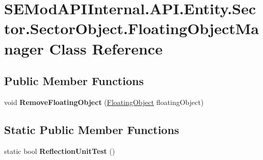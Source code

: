 \hypertarget{class_s_e_mod_a_p_i_internal_1_1_a_p_i_1_1_entity_1_1_sector_1_1_sector_object_1_1_floating_object_manager}{}\section{S\+E\+Mod\+A\+P\+I\+Internal.\+A\+P\+I.\+Entity.\+Sector.\+Sector\+Object.\+Floating\+Object\+Manager Class Reference}
\label{class_s_e_mod_a_p_i_internal_1_1_a_p_i_1_1_entity_1_1_sector_1_1_sector_object_1_1_floating_object_manager}
\subsection*{Public Member Functions}
\begin{DoxyCompactItemize}
\item 
\hypertarget{class_s_e_mod_a_p_i_internal_1_1_a_p_i_1_1_entity_1_1_sector_1_1_sector_object_1_1_floating_object_manager_a5f6f1cf739bde796ff9819dc405d1080}{}void {\bfseries Remove\+Floating\+Object} (\hyperlink{class_s_e_mod_a_p_i_internal_1_1_a_p_i_1_1_entity_1_1_sector_1_1_sector_object_1_1_floating_object}{Floating\+Object} floating\+Object)\label{class_s_e_mod_a_p_i_internal_1_1_a_p_i_1_1_entity_1_1_sector_1_1_sector_object_1_1_floating_object_manager_a5f6f1cf739bde796ff9819dc405d1080}

\end{DoxyCompactItemize}
\subsection*{Static Public Member Functions}
\begin{DoxyCompactItemize}
\item 
\hypertarget{class_s_e_mod_a_p_i_internal_1_1_a_p_i_1_1_entity_1_1_sector_1_1_sector_object_1_1_floating_object_manager_a2c84b12f9e0c2eb605476a23dc8263da}{}static bool {\bfseries Reflection\+Unit\+Test} ()\label{class_s_e_mod_a_p_i_internal_1_1_a_p_i_1_1_entity_1_1_sector_1_1_sector_object_1_1_floating_object_manager_a2c84b12f9e0c2eb605476a23dc8263da}

\end{DoxyCompactItemize}
